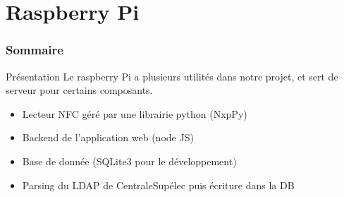 \documentclass[aspectratio=169]{beamer}
\begin{document}
\section{Raspberry Pi}

\begin{frame}
    \frametitle{Sommaire}
    \tableofcontents[
      currentsection,
      sectionstyle=show/shaded,
      subsectionstyle=show/shaded/hide
    ]
\end{frame}

\begin{frame}{Présentation}
    Le raspberry Pi a plusieurs utilités dans notre projet, et sert de serveur pour certains composants.
    \begin{itemize}
        \item Lecteur NFC géré par une librairie python (NxpPy)
        \item Backend de l'application web (node JS)
        \item Base de donnée (SQLite3 pour le développement)
        \item Parsing du LDAP de CentraleSupélec puis écriture dans la DB
    \end{itemize}


\end{frame}
\end{document}
